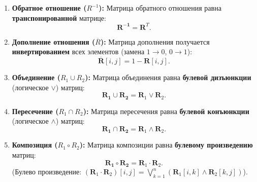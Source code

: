 \begin{enumerate}
    \item \textbf{Обратное отношение ($R^{-1}$):} Матрица обратного отношения равна \textbf{транспонированной} матрице:
    $$\mathbf{R^{-1}} = \mathbf{R}^T.$$

    \item \textbf{Дополнение отношения ($\overline{R}$):} Матрица дополнения получается \textbf{инвертированием} всех элементов (замена $1 \to 0$, $0 \to 1$):
    $$\overline{\mathbf{R}}[i, j] = 1 - \mathbf{R}[i, j].$$
    
    \item \textbf{Объединение ($R_1 \cup R_2$):} Матрица объединения равна \textbf{булевой дизъюнкции} (логическое $\lor$) матриц:
    $$\mathbf{R_1 \cup R_2} = \mathbf{R}_1 \lor \mathbf{R}_2.$$

    \item \textbf{Пересечение ($R_1 \cap R_2$):} Матрица пересечения равна \textbf{булевой конъюнкции} (логическое $\land$) матриц:
    $$\mathbf{R_1 \cap R_2} = \mathbf{R}_1 \land \mathbf{R}_2.$$

    \item \textbf{Композиция ($R_1 \circ R_2$):} Матрица композиции равна \textbf{булевому произведению} матриц:
    $$\mathbf{R_1 \circ R_2} = \mathbf{R}_1 \cdot \mathbf{R}_2.$$
    (Булево произведение: $(\mathbf{R}_1 \cdot \mathbf{R}_2)[i, j] = \bigvee_{k=1}^n (\mathbf{R}_1[i, k] \land \mathbf{R}_2[k, j])$).
\end{enumerate}
